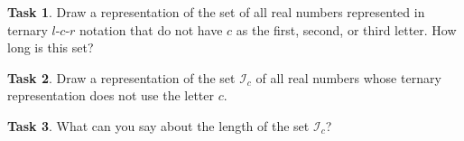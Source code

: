 \documentclass[12pt]{amsart}
\theoremstyle{definition}
\newtheorem{task}{Task}
\begin{document}
\begin{task} Draw a representation of the set of all real numbers represented in ternary $l$-$c$-$r$ notation that do not have $c$ as the first, second, or third letter. How long is this set? \\
\end{task}

\begin{task} Draw a representation of the set $\mathcal{I}_c$ of all real numbers whose ternary representation does not use the letter $c$. \\
\end{task}

\begin{task} What can you say about the length of the set $\mathcal{I}_c$?
\end{task}
\end{document}
